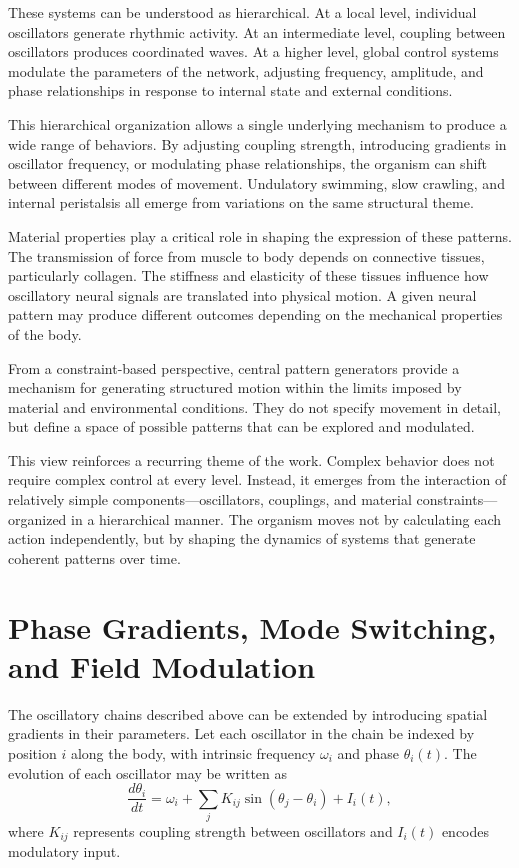 \documentclass[11pt,oneside]{book}
\begin{document}
These systems can be understood as hierarchical. At a local level, individual oscillators generate rhythmic activity. At an intermediate level, coupling between oscillators produces coordinated waves. At a higher level, global control systems modulate the parameters of the network, adjusting frequency, amplitude, and phase relationships in response to internal state and external conditions.

This hierarchical organization allows a single underlying mechanism to produce a wide range of behaviors. By adjusting coupling strength, introducing gradients in oscillator frequency, or modulating phase relationships, the organism can shift between different modes of movement. Undulatory swimming, slow crawling, and internal peristalsis all emerge from variations on the same structural theme.

Material properties play a critical role in shaping the expression of these patterns. The transmission of force from muscle to body depends on connective tissues, particularly collagen. The stiffness and elasticity of these tissues influence how oscillatory neural signals are translated into physical motion. A given neural pattern may produce different outcomes depending on the mechanical properties of the body.

From a constraint-based perspective, central pattern generators provide a mechanism for generating structured motion within the limits imposed by material and environmental conditions. They do not specify movement in detail, but define a space of possible patterns that can be explored and modulated.

This view reinforces a recurring theme of the work. Complex behavior does not require complex control at every level. Instead, it emerges from the interaction of relatively simple components—oscillators, couplings, and material constraints—organized in a hierarchical manner. The organism moves not by calculating each action independently, but by shaping the dynamics of systems that generate coherent patterns over time.

\section{Phase Gradients, Mode Switching, and Field Modulation}

The oscillatory chains described above can be extended by introducing spatial gradients in their parameters. Let each oscillator in the chain be indexed by position $i$ along the body, with intrinsic frequency $\omega_i$ and phase $\theta_i(t)$. The evolution of each oscillator may be written as
\[
\frac{d\theta_i}{dt} = \omega_i + \sum_{j} K_{ij}\sin(\theta_j - \theta_i) + I_i(t),
\]
where $K_{ij}$ represents coupling strength between oscillators and $I_i(t)$ encodes modulatory input.
\end{document}
